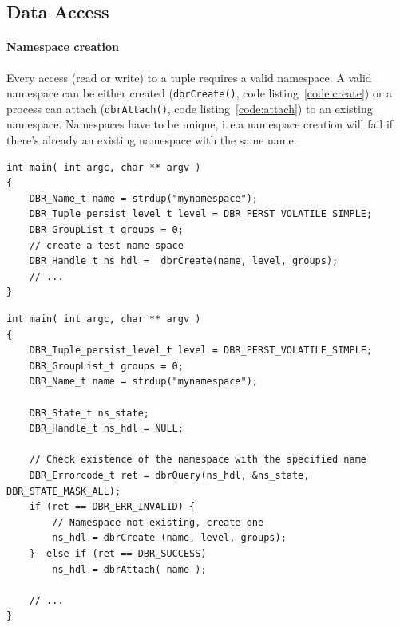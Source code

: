 \subsection{Data Access}
\label{sec:interface:access}
\paragraph{Namespace creation} Every access (read or write) to a tuple
requires a valid namespace.  A valid namespace can be either created
(\texttt{dbrCreate()}, code listing~\ref{code:create}) or a process can attach (\texttt{dbrAttach()}, code listing~\ref{code:attach}) to an
existing namespace.  Namespaces have to be unique, i.\,e.\@ a
namespace creation will fail if there's already an existing namespace
with the same name.

\begin{lstlisting}[style=mystyle,basicstyle=\scriptsize\ttfamily,caption=Creation of a namespace, label=code:create]
int main( int argc, char ** argv )
{
	DBR_Name_t name = strdup("mynamespace");
	DBR_Tuple_persist_level_t level = DBR_PERST_VOLATILE_SIMPLE;
	DBR_GroupList_t groups = 0;
	// create a test name space
	DBR_Handle_t ns_hdl =  dbrCreate(name, level, groups);
	// ...
}
\end{lstlisting}

\begin{lstlisting}[style=mystyle,basicstyle=\scriptsize\ttfamily,caption=Attach to a namespace, label=code:attach]
int main( int argc, char ** argv ) 
{
	DBR_Tuple_persist_level_t level = DBR_PERST_VOLATILE_SIMPLE;
	DBR_GroupList_t groups = 0;
	DBR_Name_t name = strdup("mynamespace");
	
	DBR_State_t ns_state;
	DBR_Handle_t ns_hdl = NULL;
	
	// Check existence of the namespace with the specified name
	DBR_Errorcode_t ret = dbrQuery(ns_hdl, &ns_state, DBR_STATE_MASK_ALL);
	if (ret == DBR_ERR_INVALID) {
		// Namespace not existing, create one 
		ns_hdl = dbrCreate (name, level, groups);
	}  else if (ret == DBR_SUCCESS)
		ns_hdl = dbrAttach( name );
		
	// ...
}
\end{lstlisting}

